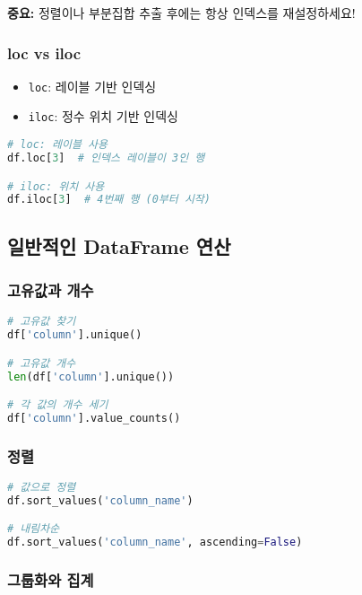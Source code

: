 \documentclass[12pt,a4paper]{article}
\begin{document}
\textbf{중요:} 정렬이나 부분집합 추출 후에는 항상 인덱스를 재설정하세요!

\subsubsection{loc vs iloc}

\begin{itemize}
    \item \texttt{loc}: 레이블 기반 인덱싱
    \item \texttt{iloc}: 정수 위치 기반 인덱싱
\end{itemize}

\begin{lstlisting}[language=Python]
# loc: 레이블 사용
df.loc[3]  # 인덱스 레이블이 3인 행

# iloc: 위치 사용
df.iloc[3]  # 4번째 행 (0부터 시작)
\end{lstlisting}

\subsection{일반적인 DataFrame 연산}

\subsubsection{고유값과 개수}

\begin{lstlisting}[language=Python]
# 고유값 찾기
df['column'].unique()

# 고유값 개수
len(df['column'].unique())

# 각 값의 개수 세기
df['column'].value_counts()
\end{lstlisting}

\subsubsection{정렬}

\begin{lstlisting}[language=Python]
# 값으로 정렬
df.sort_values('column_name')

# 내림차순
df.sort_values('column_name', ascending=False)
\end{lstlisting}

\subsubsection{그룹화와 집계}
\end{document}
